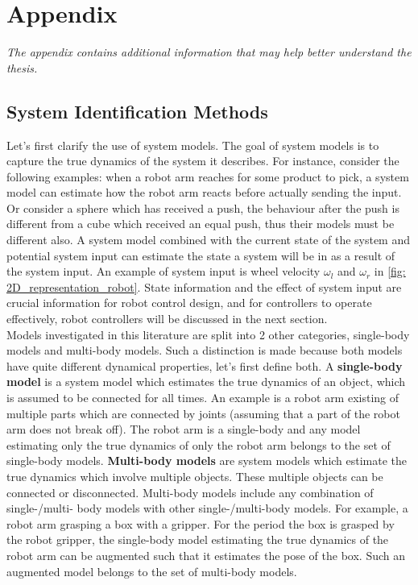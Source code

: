 \chapter{Appendix}%
\label{chap:appendix}

\appendix

\textit{The appendix contains additional information that may help better understand the thesis.\bs}
\newpage

\section{System Identification Methods}
\label{sec:appendix_sys_iden_methods}


\label{section: system_model_representation}
Let's first clarify the use of system models. The goal of system models is to capture the true dynamics of the system it describes. For instance, consider the following examples: when a robot arm reaches for some product to pick, a system model can estimate how the robot arm reacts before actually sending the input. Or consider a sphere which has received a push, the behaviour after the push is different from a cube which received an equal push, thus their models must be different also. A system model combined with the current state of the system and potential system input can estimate the state a system will be in as a result of the system input. An example of system input is wheel velocity $\omega_l$ and $\omega_r$ in \cref{fig: 2D_representation_robot}. State information and the effect of system input are crucial information for robot control design, and for controllers to operate effectively, robot controllers will be discussed in the next section.\\

Models investigated in this literature are split into 2 other categories, single-body models and multi-body models. Such a distinction is made because both models have quite different dynamical properties, let's first define both. A \textbf{single-body model} is a system model which estimates the true dynamics of an object, which is assumed to be connected for all times. An example is a robot arm existing of multiple parts which are connected by joints (assuming that a part of the robot arm does not break off). The robot arm is a single-body and any model estimating only the true dynamics of only the robot arm belongs to the set of single-body models. \textbf{Multi-body models} are system models which estimate the true dynamics which involve multiple objects. These multiple objects can be connected or disconnected. Multi-body models include any combination of single-/multi- body models with other single-/multi-body models. For example, a robot arm grasping a box with a gripper. For the period the box is grasped by the robot gripper, the single-body model estimating the true dynamics of the robot arm can be augmented such that it estimates the pose of the box. Such an augmented model belongs to the set of multi-body models.\\

